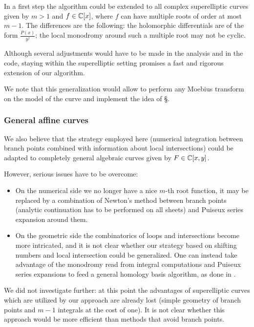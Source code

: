 \documentclass[main.tex]{subfiles}
\begin{document}
  In a first step the algorithm could be
  extended to all complex superelliptic curves given by $m > 1$ and $f \in
  \mathbb{C}[x]$, where $f$ can have multiple roots of order at most $m-1$.
  The differences are the following: the holomorphic differentials are
  of the form $\frac{P(x)}{y^j}$; the local monodromy around such a
  multiple root may not be cyclic.

  Although several adjustments would have to be made in the analysis and in the
  code, staying within the superelliptic setting promises
  a fast and rigorous extension of our algorithm. 

  We note that this generalization would allow to perform any Moebius transform on the
  model of the curve and implement the idea of \S \label{subsec:improving}.

  \subsubsection{General affine curves}
  
  We also believe that the strategy employed here (numerical integration between
  branch points combined with information about local intersections) could
  be adapted to completely general algebraic curves given by $F \in \mathbb{C}[x,y]$.

  However, serious issues have to be overcome:
  \begin{itemize}
      \item On the numerical side we no longer have a nice $m$-th root function,
          it may be replaced by a combination of Newton's method between branch
          points (analytic continuation has to
          be performed on all sheets) and
          Puiseux series expansion around them.
      \item On the geometric side the combinatorics of loops and intersections
          become more intricated, and it is not clear whether our strategy
          based on shifting numbers and local intersection could be generalized.
          One can instead take advantage of the monodromy read from
          integral computations and Puiseux series expansions to feed a general
          homology basis algorithm, as done in \cite{FrauendienerKlein2016}.
  \end{itemize}
  We did not investigate further: at this point the advantages
  of superelliptic curves which are utilized by our approach are already lost
  (simple geometry of branch points and $m-1$ integrals at the cost of one).
  It is not clear whether this approach would
  be more efficient than methods that avoid branch points.

  \biblio
  
\end{document}
